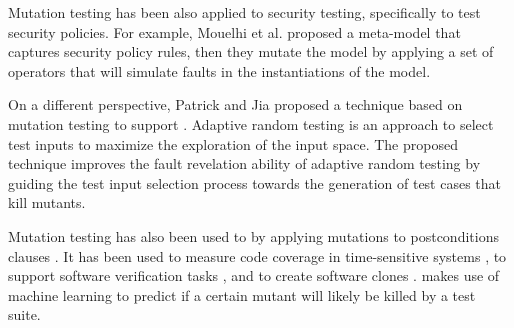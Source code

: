 
Mutation testing has been also applied to security testing, specifically to test security policies. For example, Mouelhi et al. \cite{mouelhiv2008generic} proposed a meta-model that captures security policy rules, then they mutate the model by applying a set of operators that will simulate faults in the instantiations of the model. 

On a different perspective, Patrick and Jia \cite{patrick2015kernel} proposed a technique based on mutation testing to support .
Adaptive random testing is an approach to select test inputs to maximize the exploration of the input space.
The proposed technique improves the fault revelation ability of adaptive random testing by guiding the test input selection process towards the generation of test cases that kill mutants.

Mutation testing has also been used to  by applying mutations to postconditions clauses \cite{galeotti2015inferring}. It has been used to measure code coverage in time-sensitive systems \cite{pankumhang2015iterative}, to support software verification tasks \cite{groce2015verified}, and to create software clones \cite{roy2009mutation}.  \cite{zhang2018predictive} makes use of machine learning to predict if a certain mutant will likely be killed by a test suite.



